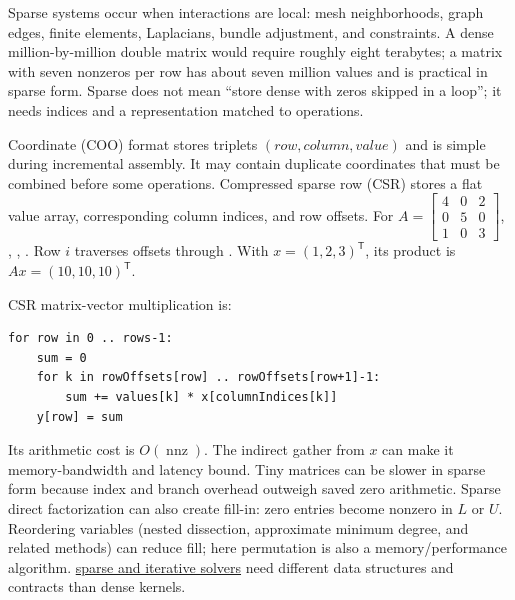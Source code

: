 Sparse systems occur when interactions are local: mesh neighborhoods, graph edges, finite elements, Laplacians, bundle adjustment, and constraints. A dense million-by-million double matrix would require roughly eight terabytes; a matrix with seven nonzeros per row has about seven million values and is practical in sparse form. Sparse does not mean ``store dense with zeros skipped in a loop''; it needs indices and a representation matched to operations.

Coordinate (COO) format stores triplets \((row,column,value)\) and is simple during incremental assembly. It may contain duplicate coordinates that must be combined before some operations. Compressed sparse row (CSR) stores a flat value array, corresponding column indices, and row offsets. For \(A=\begin{bmatrix}4&0&2\\0&5&0\\1&0&3\end{bmatrix}\), , , . Row \(i\) traverses offsets  through . With \(x=(1,2,3)^\mathsf T\), its product is \(Ax=(10,10,10)^\mathsf T\).

CSR matrix-vector multiplication is:

\begin{verbatim}
for row in 0 .. rows-1:
    sum = 0
    for k in rowOffsets[row] .. rowOffsets[row+1]-1:
        sum += values[k] * x[columnIndices[k]]
    y[row] = sum
\end{verbatim}

Its arithmetic cost is \(O(\operatorname{nnz})\). The indirect gather from \(x\) can make it memory-bandwidth and latency bound. Tiny matrices can be slower in sparse form because index and branch overhead outweigh saved zero arithmetic. Sparse direct factorization can also create fill-in: zero entries become nonzero in \(L\) or \(U\). Reordering variables (nested dissection, approximate minimum degree, and related methods) can reduce fill; here permutation is also a memory/performance algorithm. \hyperref[02-foundations-ii-ch038-sparse-storage-changes-the-cost-model]{sparse and iterative solvers} need different data structures and contracts than dense kernels.

